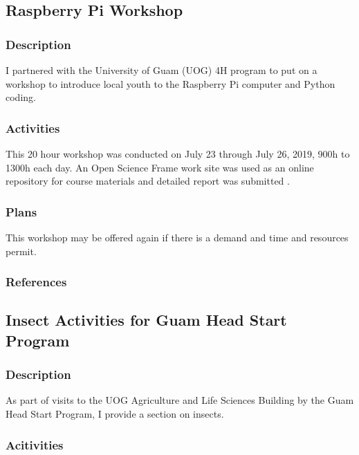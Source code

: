\subsection{Raspberry Pi Workshop}
\begin{refsection}
	
\subsubsection{Description}

I partnered with the University of Guam (UOG) 4H program to put on a workshop to introduce local youth to the Raspberry Pi computer and Python coding. 

\subsubsection{Activities}

This 20 hour workshop was conducted on July 23 through July 26, 2019, 900h to 1300h each day. An Open Science Frame work site was used as an online repository for course materials \cite{moore_open_2018} and detailed report was submitted \cite{moore_report_2019-1}.

\subsubsection{Plans}

This workshop may be offered again if there is a demand and time and resources permit.

\subsubsection{References}
\printbibliography[heading=none]
\end{refsection}

\subsection{Insect Activities for Guam Head Start Program}

\subsubsection{Description}

As part of visits to the UOG Agriculture and Life Sciences Building by the Guam Head Start Program, I provide a section on insects.

\subsubsection{Acitivities}

